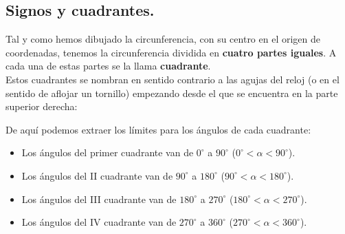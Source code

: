 \documentclass[a4paper,11pt,answers]{exam}
\newcommand{\degree}{^\circ}
\begin{document}
\subsection{Signos y cuadrantes.}
Tal y como hemos dibujado la circunferencia, con su centro en el origen de coordenadas, tenemos la circunferencia dividida en \textbf{cuatro partes iguales}. A cada una de estas partes se la llama \textbf{cuadrante}.\\
Estos cuadrantes se nombran en sentido contrario a las agujas del reloj (o en el sentido de aflojar un tornillo) empezando desde el que se encuentra en la parte superior derecha:
\begin{center}
\end{center}
De aquí podemos extraer los límites para los ángulos de cada cuadrante:
\begin{itemize}
\item Los ángulos del primer cuadrante van de $0\degree$ a $90\degree$ ($0\degree < \alpha < 90\degree$).
\item Los ángulos del II cuadrante van de $90\degree$ a $180\degree$ ($90\degree < \alpha < 180\degree$).
\item Los ángulos del III cuadrante van de $180\degree$ a $270\degree$ ($180\degree < \alpha < 270\degree$).
\item Los ángulos del IV cuadrante van de $270\degree$ a $360\degree$ ($270\degree < \alpha < 360\degree$).
\end{itemize}
\end{document}
